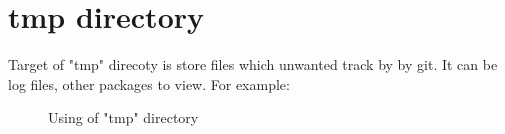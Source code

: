 \section{tmp directory}

\begin{crules}
\end{crules}

Target of "tmp" direcoty is store files which unwanted track by by git.
It can be log files, other packages to view. For example:

\begin{figure}[h]
    \caption{Using of "tmp" directory}
    
\end{figure}
